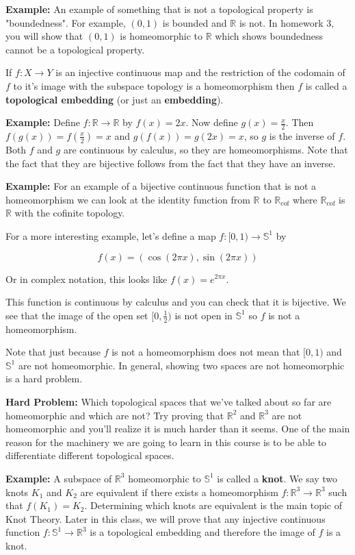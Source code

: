 \documentclass[a4paper]{article}
\numberwithin{theorem}{section}
\begin{document}
\textbf{Example:} An example of something that is not a topological property is "boundedness". For example, $(0,1)$ is bounded and $\mathbb{R}$ is not. In homework 3, you will show that $(0,1)$ is homeomorphic to $\mathbb{R}$ which shows boundedness cannot be a topological property.

If $f: X \rightarrow Y$ is an injective continuous map and the restriction of the codomain of $f$ to it's image with the subspace topology is a homeomorphism then $f$ is called a \textbf{topological embedding} (or just an \textbf{embedding}).

\textbf{Example:} Define $f: \mathbb{R} \rightarrow \mathbb{R}$ by $f(x) = 2x$. Now define $g(x) = \frac{x}{2}$. Then $f(g(x)) = f \left( \frac{x}{2} \right) = x$ and $g(f(x)) = g(2x) = x$, so $g$ is the inverse of $f$. Both $f$ and $g$ are continuous by calculus, so they are homeomorphisms. Note that the fact that they are bijective follows from the fact that they have an inverse.

\textbf{Example:} For an example of a bijective continuous function that is not a homeomorphism we can look at the identity function from $\mathbb{R}$ to $\mathbb{R}_{\textrm{cof}}$ where $\mathbb{R}_{\textrm{cof}}$ is $\mathbb{R}$ with the cofinite topology.

For a more interesting example, let's define a map $f: [0,1) \rightarrow \mathbb{S}^1$ by 

$$ f(x) = (\cos (2\pi x),\sin (2\pi x)) $$

Or in complex notation, this looks like $f(x) = e^{2\pi x}$.

This function is continuous by calculus and you can check that it is bijective. We see that the image of the open set $[0,\frac{1}{2})$ is not open in $\mathbb{S}^1$ so $f$ is not a homeomorphism.

Note that just because $f$ is not a homeomorphism does not mean that $[0,1)$ and $\mathbb{S}^1$ are not homeomorphic. In general, showing two spaces are not homeomorphic is a hard problem.

\textbf{Hard Problem:} Which topological spaces that we've talked about so far are homeomorphic and which are not? Try proving that $\mathbb{R}^2$ and $\mathbb{R}^3$ are not homeomorphic and you'll realize it is much harder than it seems. One of the main reason for the machinery we are going to learn in this course is to be able to differentiate different topological spaces.

\textbf{Example:} A subspace of $\mathbb{R}^3$ homeomorphic to $\mathbb{S}^1$ is called a \textbf{knot}. We say two knots $K_1$ and $K_2$ are equivalent if there exists a homeomorphism $f: \mathbb{R}^3 \rightarrow \mathbb{R}^3$ such that $f(K_1) = K_2$. Determining which knots are equivalent is the main topic of Knot Theory. Later in this class, we will prove that any injective continuous function $f: \mathbb{S}^1 \rightarrow \mathbb{R}^3$ is a topological embedding and therefore the image of $f$ is a knot.
\end{document}
